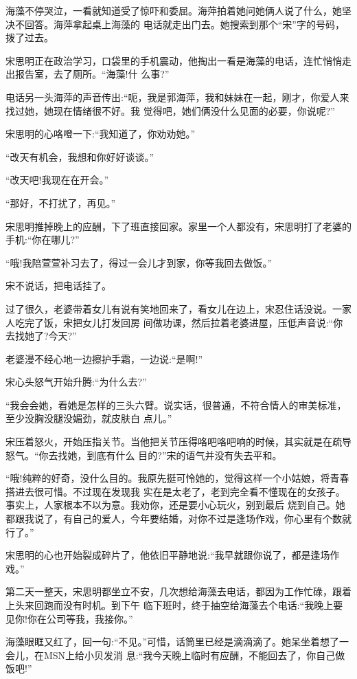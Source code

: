 \documentclass[11pt,a4paper,onecolumn]{article}
\begin{document}
海藻不停哭泣，一看就知道受了惊吓和委屈。海萍拍着她问她俩人说了什么，她坚决不回答。海萍拿起桌上海藻的
电话就走出门去。她搜索到那个``宋''字的号码，拨了过去。

宋思明正在政治学习，口袋里的手机震动，他掏出一看是海藻的电话，连忙悄悄走出报告室，去了厕所。``海藻!什
么事?''

电话另一头海萍的声音传出:``呃，我是郭海萍，我和妹妹在一起，刚才，你爱人来找过她，她现在情绪很不好。我
觉得吧，她们俩没什么见面的必要，你说呢?''

宋思明的心咯噔一下:``我知道了，你劝劝她。''

``改天有机会，我想和你好好谈谈。''

``改天吧!我现在在开会。''

``那好，不打扰了，再见。''

宋思明推掉晚上的应酬，下了班直接回家。家里一个人都没有，宋思明打了老婆的手机:``你在哪儿?''

``哦!我陪萱萱补习去了，得过一会儿才到家，你等我回去做饭。''

宋不说话，把电话挂了。

过了很久，老婆带着女儿有说有笑地回来了，看女儿在边上，宋忍住话没说。一家人吃完了饭，宋把女儿打发回房
间做功课，然后拉着老婆进屋，压低声音说:``你去找她了?今天?''

老婆漫不经心地一边擦护手霜，一边说:``是啊!''

宋心头怒气开始升腾:``为什么去?''

``我会会她，看她是怎样的三头六臂。说实话，很普通，不符合情人的审美标准，至少没胸没腿没媚劲，就皮肤白
点儿。''

宋压着怒火，开始压指关节。当他把关节压得咯吧咯吧响的时候，其实就是在疏导怒气。``你去找她，到底有什么
目的?''宋的语气并没有失去平和。

``哦!纯粹的好奇，没什么目的。我原先挺可怜她的，觉得这样一个小姑娘，将青春搭进去很可惜。不过现在发现我
实在是太老了，老到完全看不懂现在的女孩子。事实上，人家根本不以为意。我劝你，还是要小心玩火，别到最后
烧到自己。她都跟我说了，有自己的爱人，今年要结婚，对你不过是逢场作戏，你心里有个数就行了。''

宋思明的心也开始裂成碎片了，他依旧平静地说:``我早就跟你说了，都是逢场作戏。''

第二天一整天，宋思明都坐立不安，几次想给海藻去电话，都因为工作忙碌，跟着上头来回跑而没有时机。到下午
临下班时，终于抽空给海藻去个电话:``我晚上要见你!你在公司等我，我接你。''

海藻眼眶又红了，回一句:``不见。''可惜，话筒里已经是滴滴滴了。她呆坐着想了一会儿，在MSN上给小贝发消
息:``我今天晚上临时有应酬，不能回去了，你自己做饭吧!''
\end{document}
